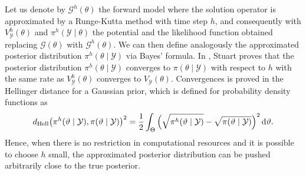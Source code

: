 \documentclass[10pt]{article}
\begin{document}
Let us denote by $\mathcal{G}^h(\theta)$ the forward model where the solution operator is approximated by a Runge-Kutta method with time step $h$, and consequently with $V^h_\mathcal{Y}(\theta)$ and $\pi^h(\mathcal{Y}\mid\theta)$ the potential and the likelihood function obtained replacing $\mathcal{G}(\theta)$ with $\mathcal{G}^h(\theta)$. We can then define analogously the approximated posterior distribution $\pi^h(\theta \mid \mathcal{Y})$ via Bayes' formula. In \cite[Theorem 4.6]{Stu10}, Stuart proves that the posterior distribution $\pi^h(\theta\mid\mathcal{Y})$ converges to $\pi(\theta\mid\mathcal{Y})$ with respect to $h$ with the same rate as $V^h_\mathcal{Y}(\theta)$ converges to $V_\mathcal{Y}(\theta)$. Convergences is proved in the Hellinger distance for a Gaussian prior, which is defined for probability density functions as
\begin{equation}
	d_{\mathrm{Hell}}\big(\pi^h(\vartheta\mid\mathcal{Y}), \pi(\vartheta\mid\mathcal{Y})\big)^2 = \frac{1}{2}\int_{\Theta} \Big(\sqrt{\pi^h(\vartheta\mid\mathcal{Y})} - \sqrt{\pi(\vartheta\mid\mathcal{Y})}\Big)^2 \, \mathrm{d} \vartheta.
\end{equation}
Hence, when there is no restriction in computational resources and it is possible to choose $h$ small, the approximated posterior distribution can be pushed arbitrarily close to the true posterior.
\end{document}
